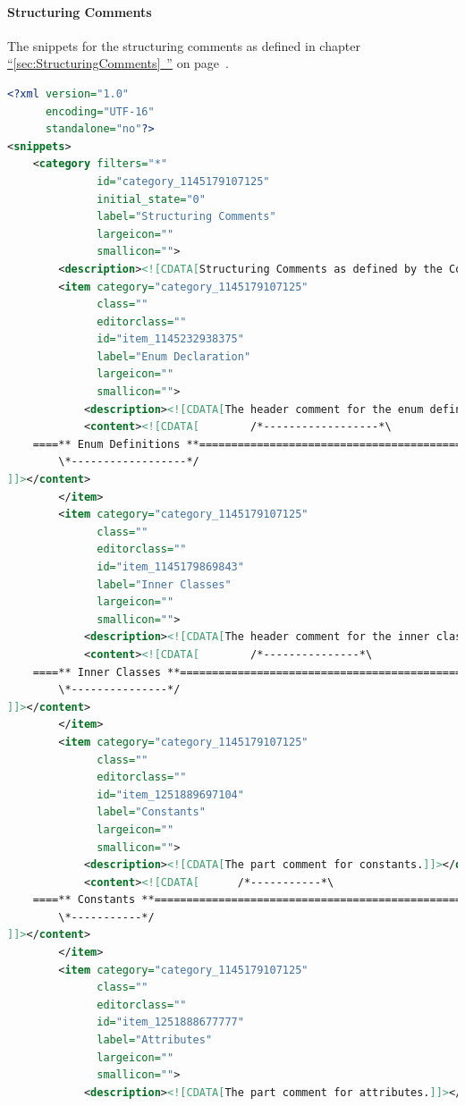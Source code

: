 \documentclass[11pt,a4paper, titlepage, parskip=half, headsepline, footsepline, cleardoublepage=current, headheight=1cm]{scrbook}
\newcommand*{\tqfullvref}[1]{\hyperref[{#1}]{“\ref*{#1}~\nameref*{#1}”} on page~\pageref{#1}}
\begin{document}
\paragraph{Structuring Comments}\label{sec:SnippetStructuringComments}
The snippets for the structuring comments as defined in chapter \tqfullvref{sec:StructuringComments}.
\begin{lstlisting}[language=XML,basicstyle=\ttfamily\footnotesize]
<?xml version="1.0"
      encoding="UTF-16" 
      standalone="no"?>
<snippets>
    <category filters="*"
              id="category_1145179107125"
              initial_state="0"
              label="Structuring Comments"
              largeicon=""
              smallicon="">
        <description><![CDATA[Structuring Comments as defined by the Code Conventions]]></description>
        <item category="category_1145179107125"
              class=""
              editorclass=""
              id="item_1145232938375"
              label="Enum Declaration"
              largeicon=""
              smallicon="">
            <description><![CDATA[The header comment for the enum definition part]]></description>
            <content><![CDATA[        /*------------------*\
    ====** Enum Definitions **=================================================
        \*------------------*/
]]></content>
        </item>
        <item category="category_1145179107125"
              class=""
              editorclass=""
              id="item_1145179869843"
              label="Inner Classes"
              largeicon=""
              smallicon="">
            <description><![CDATA[The header comment for the inner classes part]]></description>
            <content><![CDATA[        /*---------------*\
    ====** Inner Classes **====================================================
        \*---------------*/
]]></content>
        </item>
        <item category="category_1145179107125"
              class=""
              editorclass=""
              id="item_1251889697104"
              label="Constants"
              largeicon=""
              smallicon="">
            <description><![CDATA[The part comment for constants.]]></description>
            <content><![CDATA[      /*-----------*\
    ====** Constants **========================================================
        \*-----------*/
]]></content>
        </item>
        <item category="category_1145179107125"
              class=""
              editorclass=""
              id="item_1251888677777"
              label="Attributes"
              largeicon=""
              smallicon="">
            <description><![CDATA[The part comment for attributes.]]></description>

\end{lstlisting}
\end{document}
